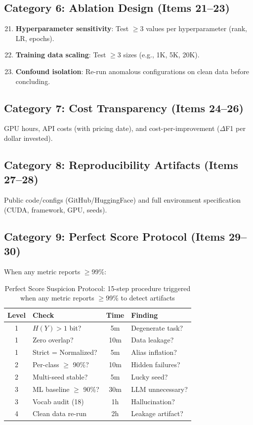 \documentclass[review,3p]{elsarticle}
\begin{document}
\subsection{Category 6: Ablation Design (Items 21--23)}
\begin{enumerate}\setcounter{enumi}{20}
\item \textbf{Hyperparameter sensitivity}: Test $\geq$3 values per hyperparameter (rank, LR, epochs).
\item \textbf{Training data scaling}: Test $\geq$3 sizes (e.g., 1K, 5K, 20K).
\item \textbf{Confound isolation}: Re-run anomalous configurations on clean data before concluding.
\end{enumerate}

\subsection{Category 7: Cost Transparency (Items 24--26)}
GPU hours, API costs (with pricing date), and cost-per-improvement ($\Delta$F1 per dollar invested).

\subsection{Category 8: Reproducibility Artifacts (Items 27--28)}
Public code/configs (GitHub/HuggingFace) and full environment specification (CUDA, framework, GPU, seeds).

\subsection{Category 9: Perfect Score Protocol (Items 29--30)}
When any metric reports $\geq$99\%:

\begin{table}[!ht]
\centering
\caption{Perfect Score Suspicion Protocol: 15-step procedure triggered when any metric reports $\geq$99\% to detect artifacts}
\label{tab:protocol}
\begin{tabular}{clcl}
\toprule
\textbf{Level} & \textbf{Check} & \textbf{Time} & \textbf{Finding} \\
\midrule
1 & $H(Y) > 1$ bit? & 5m & Degenerate task? \\
1 & Zero overlap? & 10m & Data leakage? \\
1 & Strict = Normalized? & 5m & Alias inflation? \\
2 & Per-class $\geq$ 90\%? & 10m & Hidden failures? \\
2 & Multi-seed stable? & 5m & Lucky seed? \\
3 & ML baseline $\geq$ 90\%? & 30m & LLM unnecessary? \\
3 & Vocab audit (18) & 1h & Hallucination? \\
4 & Clean data re-run & 2h & Leakage artifact? \\
\bottomrule
\end{tabular}
\end{table}
\end{document}
